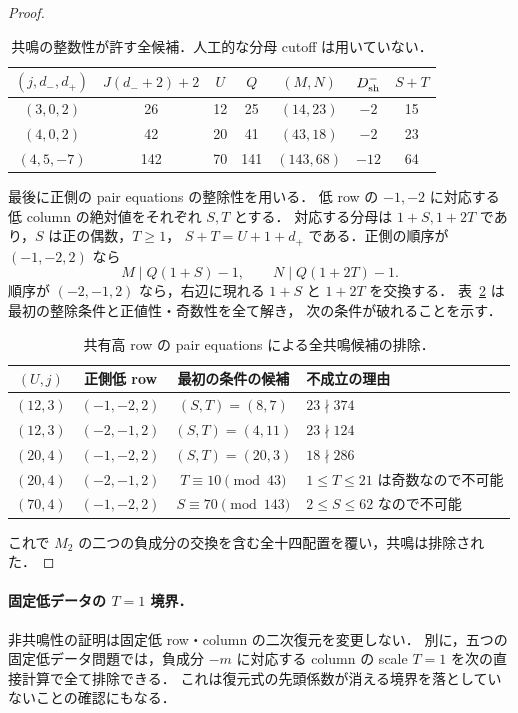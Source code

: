 \begin{proof}
\begin{table}[htbp]
\centering\small
\begin{tabular}{c|c|c|c|c|c|c}
$(j,d_-,d_+)$&$J(d_-+2)+2$&$U$&$Q$&$(M,N)$&$D_{\rm sh}^-$&$S+T$\\\hline
$(3,0,2)$&26&12&25&$(14,23)$&$-2$&15\\
$(4,0,2)$&42&20&41&$(43,18)$&$-2$&23\\
$(4,5,-7)$&142&70&141&$(143,68)$&$-12$&64
\end{tabular}
\caption{共鳴の整数性が許す全候補．人工的な分母 cutoff は用いていない．}
\label{g51522:finite-resonances}
\end{table}

最後に正側の pair equations の整除性を用いる．
低 row の $-1,-2$ に対応する低 column の絶対値をそれぞれ $S,T$ とする．
対応する分母は $1+S,1+2T$ であり，$S$ は正の偶数，$T\ge1$，
$S+T=U+1+d_+$ である．正側の順序が $(-1,-2,2)$ なら
\begin{equation}\label{g51522:positive-divisibilities}
 M\mid Q(1+S)-1,\qquad N\mid Q(1+2T)-1.
\end{equation}
順序が $(-2,-1,2)$ なら，右辺に現れる $1+S$ と $1+2T$ を交換する．
表~\ref{g51522:pair-failures} は最初の整除条件と正値性・奇数性を全て解き，
次の条件が破れることを示す．

\begin{table}[htbp]
\centering\small
\begin{tabular}{c|c|c|l}
$(U,j)$&正側低 row&最初の条件の候補&不成立の理由\\\hline
$(12,3)$&$(-1,-2,2)$&$(S,T)=(8,7)$&$23\nmid374$\\
$(12,3)$&$(-2,-1,2)$&$(S,T)=(4,11)$&$23\nmid124$\\
$(20,4)$&$(-1,-2,2)$&$(S,T)=(20,3)$&$18\nmid286$\\
$(20,4)$&$(-2,-1,2)$&$T\equiv10\pmod {43}$&$1\le T\le21$ は奇数なので不可能\\
$(70,4)$&$(-1,-2,2)$&$S\equiv70\pmod {143}$&$2\le S\le62$ なので不可能
\end{tabular}
\caption{共有高 row の pair equations による全共鳴候補の排除．}
\label{g51522:pair-failures}
\end{table}

これで $M_2$ の二つの負成分の交換を含む全十四配置を覆い，共鳴は排除された．
\end{proof}

\paragraph{固定低データの $T=1$ 境界．}
非共鳴性の証明は固定低 row・column の二次復元を変更しない．
別に，五つの固定低データ問題では，負成分 $-m$ に対応する column の scale
$T=1$ を次の直接計算で全て排除できる．
これは復元式の先頭係数が消える境界を落としていないことの確認にもなる．

